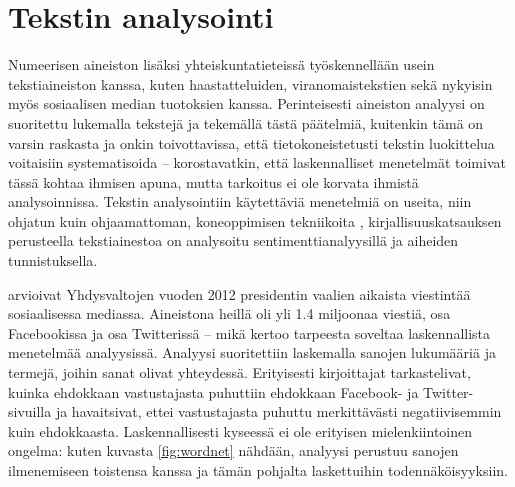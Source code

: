 \documentclass[finnish,gradu,twoside,12pt]{tktltiki}
\begin{document}
{%

\section{Tekstin analysointi}
\label{sec:textanalysis}

Numeerisen aineiston lisäksi yhteiskuntatieteissä työskennellään usein tekstiaineiston kanssa, kuten haastatteluiden, viranomaistekstien sekä nykyisin myös sosiaalisen median tuotoksien kanssa. Perinteisesti aineiston analyysi on suoritettu lukemalla tekstejä ja tekemällä tästä päätelmiä, kuitenkin tämä on varsin raskasta ja onkin toivottavissa, että tietokoneistetusti tekstin luokittelua voitaisiin systematisoida -- \citet{Grimmer2013} korostavatkin, että laskennalliset menetelmät toimivat tässä kohtaa ihmisen apuna, mutta tarkoitus ei ole korvata ihmistä analysoinnissa. Tekstin analysointiin käytettäviä menetelmiä on useita, niin ohjatun kuin ohjaamattoman, koneoppimisen tekniikoita \citep[esimerkiksi][]{Grimmer2013}, kirjallisuuskatsauksen perusteella tekstiainestoa on analysoitu sentimenttianalyysillä ja aiheiden tunnistuksella.

\citet{groshek2013public} arvioivat Yhdysvaltojen vuoden 2012 presidentin vaalien aikaista viestintää sosiaalisessa mediassa. Aineistona heillä oli yli 1.4 miljoonaa viestiä, osa Facebookissa ja osa Twitterissä -- mikä kertoo tarpeesta soveltaa laskennallista menetelmää analyysissä. Analyysi suoritettiin laskemalla sanojen lukumääriä ja termejä, joihin sanat olivat yhteydessä. Erityisesti kirjoittajat tarkastelivat, kuinka ehdokkaan vastustajasta puhuttiin ehdokkaan Facebook- ja Twitter-sivuilla ja havaitsivat, ettei vastustajasta puhuttu merkittävästi negatiivisemmin kuin ehdokkaasta. Laskennallisesti kyseessä ei ole erityisen mielenkiintoinen ongelma: kuten kuvasta \ref{fig:wordnet} nähdään, analyysi perustuu sanojen ilmenemiseen toistensa kanssa ja tämän pohjalta laskettuihin todennäköisyyksiin.

}
\end{document}
